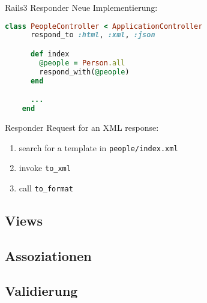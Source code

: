 \begin{frame}[fragile]{Rails3 Responder}
  Neue Implementierung:
  \begin{lstlisting}[language=Ruby,gobble=4,basicstyle=\ttfamily\small]
    class PeopleController < ApplicationController
      respond_to :html, :xml, :json

      def index
        @people = Person.all
        respond_with(@people)
      end

      ...
    end
  \end{lstlisting}
\end{frame}

\begin{frame}{Responder}
  Request for an XML response:
  \begin{enumerate}
    \item search for a template in \lstinline|people/index.xml|
    \item invoke \lstinline|to_xml|
    \item call \lstinline|to_format|
  \end{enumerate}
\end{frame}

\subsection{Views}


\subsection{Assoziationen}


\subsection{Validierung}



